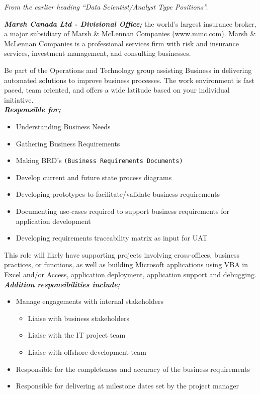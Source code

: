 \documentclass{article}
\newcounter{subsubsubsection}[subsubsection]
\begin{document}
\textit{From the earlier heading ``Data Scientist/Analyst Type Positions''.}


\textbf{\textit{Marsh Canada Ltd - Divisional Office;}} the world's largest insurance broker, a major subsidiary of Marsh & McLennan Companies (www.mmc.com). Marsh & McLennan Companies is a professional services firm with risk and insurance services, investment management, and consulting businesses. 

Be part of the Operations and Technology group assisting Business in delivering automated solutions to improve business processes. The work environment is fast paced, team oriented, and offers a wide latitude based on your individual initiative. \\

\hspace{-0.67cm} \textbf{\textit{Responsible for;}}

\begin{itemize}
    \item Understanding Business Needs
    \item Gathering Business Requirements
    \item Making BRD's \texttt{(Business Requirements Documents)}
    \item Develop current and future state process diagrams
    \item Developing prototypes to facilitate/validate business requirements
    \item Documenting use-cases required to support business requirements for application development
    \item Developing requirements traceability matrix as input for UAT
\end{itemize}

This role will likely have supporting projects involving cross-offices, business practices, or functions, as well as building Microsoft applications using VBA in Excel and/or Access, application deployment, application support and debugging. \\

\hspace{-0.67cm} \textbf{\textit{Addition responsibilities include;}}

\begin{itemize}
    \item Manage engagements with internal stakeholders
    \begin{itemize}
        \item Liaise with business stakeholders
        \item Liaise with the IT project team
        \item Liaise with offshore development team
    \end{itemize}
    \item Responsible for the completeness and accuracy of the business requirements 
    \item Responsible for delivering at milestone dates set by the project manager
\end{itemize}
\end{document}
